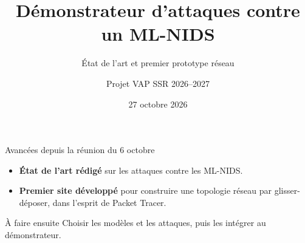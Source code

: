 \documentclass[aspectratio=169,11pt,xcolor=table]{beamer}
\title[Démonstrateur ML-NIDS]{Démonstrateur d'attaques contre un ML-NIDS}
\subtitle{État de l'art et premier prototype réseau}
\author{Projet VAP SSR 2026--2027}
\institute{Réunion avec Grégory Blanc}
\date{27 octobre 2026}
\newcommand{\espacement}{\setlength{\itemsep}{.8em}}
\begin{document}
\begin{frame}
  \titlepage
\end{frame}

\begin{frame}{Avancées depuis la réunion du 6 octobre}
  \begin{itemize}\espacement
    \item \textbf{État de l'art rédigé} sur les attaques contre les ML-NIDS.
    \item \textbf{Premier site développé} pour construire une topologie réseau par glisser-déposer, dans l'esprit de Packet Tracer.
  \end{itemize}
  \vspace{1.2em}
  \begin{block}{À faire ensuite}
    Choisir les modèles et les attaques, puis les intégrer au démonstrateur.
  \end{block}
\end{frame}
\end{document}
